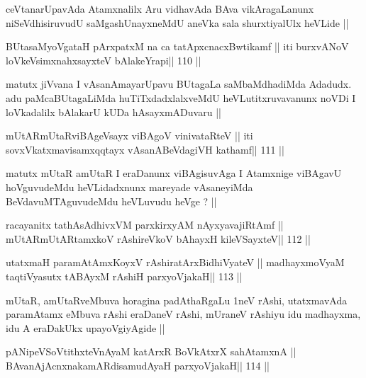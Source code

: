 \begin{artha}
ceVtanarUpavAda Atamxnalilx Aru vidhavAda BAva vikAragaLanunx
niSeVdhisiruvudU saMgashUnayxneMdU aneVka sala shurxtiyalUlx heVLide ||
\end{artha}

\begin{shl}
BUtasaMyoVgataH pArxpatxM na ca tatApxcnacxBwtikamf ||
iti burxvANoV loVkeV\s simxnahxsayxteV bAlakeYrapi\hfill || 110 ||
\end{shl}

\begin{artha}
matutx jiVvana I vAsanAmayarUpavu BUtagaLa saMbaMdhadiMda Adadudx. adu
paMcaBUtagaLiMda huTiTxdadxlalxveMdU heVLutitxruvavanunx noVDi I
loVkadalilx bAlakarU kUDa hAsayxmADuvaru ||
\end{artha}

\begin{shl}
mUtARmUtaRviBAgeV\s sayx viBAgoV vinivataRteV ||
iti sovxVkatxmavisamxqqtayx vAsanABeVdagiVH kathamf\hfill || 111 ||
\end{shl}

\begin{artha}
matutx mUtaR amUtaR I eraDanunx viBAgisuvAga I Atamxnige viBAgavU
hoVguvudeMdu heVLidadxnunx mareyade vAsaneyiMda BeVdavuMTAguvudeMdu
heVLuvudu heVge ? ||
\end{artha}


\begin{shl}
racayanitx tathA\s sAdhivxVM parxkirxyAM nAyxyavajiRtAmf ||
mUtARmUtARtamxkoV rAshireVkoV bAhayxH kileVSayxteV\hfill || 112 ||
\end{shl}

\begin{shl}
utatxmaH paramAtAmxKoyxV rAshiratArxBidhiVyateV ||
madhayxmoV\s yaM taqtiVyasutx tABAyxM rAshiH parxyoVjakaH\hfill || 113 ||
\end{shl}

\begin{artha}
mUtaR, amUtaRveMbuva horagina padAthaRgaLu 1neV rAshi, utatxmavAda
paramAtamx eMbuva rAshi eraDaneV rAshi, mUraneV rAshiyu idu madhayxma,
idu A eraDakUkx upayoVgiyAgide ||
\end{artha}


\begin{shl}
pANipeVSoVtithxteVnAyaM katArxR BoVkAtxrX sahA\s\s tamxnA ||
BAvanAjAcnxnakamARdisamudAyaH parxyoVjakaH\hfill || 114 ||
\end{shl}

